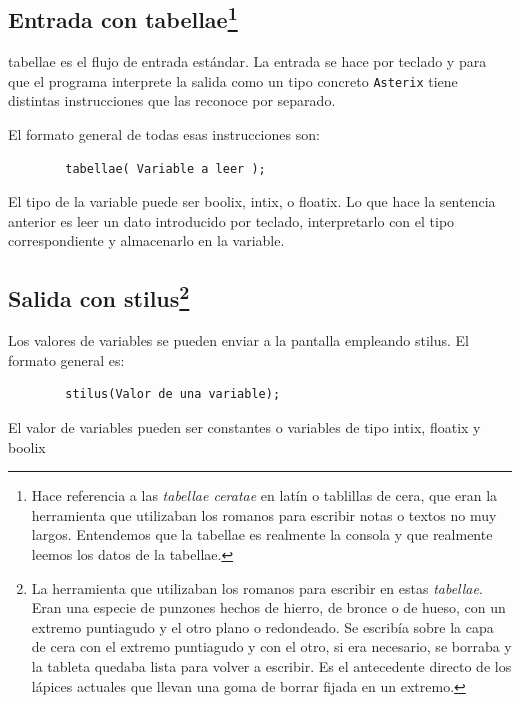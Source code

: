 \documentclass[a4paper, 10pt]{article}
\newcommand{\atx}{\texttt{Asterix} }
\begin{document}
    \subsection*{Entrada con tabellae\footnote{Hace referencia a las
    \textit{tabellae ceratae} en latín o tablillas de cera, que eran la
    herramienta que utilizaban los romanos para escribir notas o textos no muy
    largos. Entendemos que la tabellae es realmente la consola y que realmente
    leemos los datos de la tabellae.}}
    
    \textsf{tabellae} es el flujo de entrada estándar. La entrada se hace por
    teclado y para que el programa interprete la salida como un tipo concreto
    \atx tiene distintas instrucciones que las reconoce por separado.
    
    El formato general de todas esas instrucciones son:
    
    \begin{verbatim}
        tabellae( Variable a leer );
    \end{verbatim}
    
    El tipo de la variable  puede ser \textsf{boolix}, \textsf{intix}, o
    \textsf{floatix}. Lo que hace la sentencia anterior es leer un dato
    introducido por teclado, interpretarlo con el tipo correspondiente y
    almacenarlo en la variable. 

    \subsection*{Salida con stilus\footnote{La herramienta que utilizaban los
    romanos para escribir en estas \textit{tabellae}. Eran una especie de
    punzones hechos de hierro, de bronce o de hueso, con un extremo puntiagudo
    y el otro plano o redondeado. Se escribía sobre la capa de cera con el
    extremo puntiagudo y con el otro, si era necesario, se borraba y la tableta
    quedaba lista para volver a escribir. Es el antecedente directo de los
    lápices actuales que llevan una goma de borrar fijada en un extremo.}}
    
     Los valores de variables se pueden enviar a la pantalla empleando
     \textsf{stilus}. El formato general es:
    
    \begin{verbatim}
        stilus(Valor de una variable);
    \end{verbatim}
    
    El valor de variables pueden ser constantes o variables     
    de tipo \textsf{intix}, \textsf{floatix} y \textsf{boolix}
    
\end{document}

